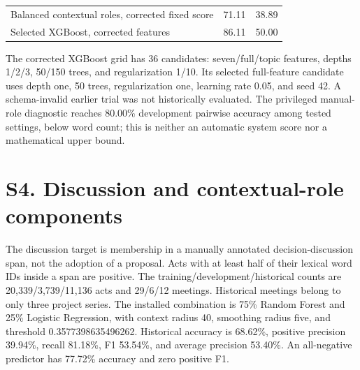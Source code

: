 \documentclass[journal,onecolumn]{IEEEtran}
\begin{document}
\begin{table}[htbp]
\begin{tabular}{p{}p{}p{}}
{\raggedright Balanced contextual roles, corrected fixed score\par} & {\raggedright 71.11\par} & {\raggedright 38.89\par} \\
{\raggedright Selected XGBoost, corrected features\par} & {\raggedright 86.11\par} & {\raggedright 50.00\par} \\
\bottomrule
\end{tabular}
\end{table}
The corrected XGBoost grid has 36 candidates: seven/full/topic features, depths 1/2/3, 50/150 trees, and regularization 1/10. Its selected full-feature candidate uses depth one, 50 trees, regularization one, learning rate 0.05, and seed 42. A schema-invalid earlier trial was not historically evaluated. The privileged manual-role diagnostic reaches 80.00\% development pairwise accuracy among tested settings, below word count; this is neither an automatic system score nor a mathematical upper bound.

\section*{S4. Discussion and contextual-role components}
The discussion target is membership in a manually annotated decision-discussion span, not the adoption of a proposal. Acts with at least half of their lexical word IDs inside a span are positive. The training/development/historical counts are 20,339/3,739/11,136 acts and 29/6/12 meetings. Historical meetings belong to only three project series. The installed combination is 75\% Random Forest and 25\% Logistic Regression, with context radius 40, smoothing radius five, and threshold 0.3577398635496262. Historical accuracy is 68.62\%, positive precision 39.94\%, recall 81.18\%, F1 53.54\%, and average precision 53.40\%. An all-negative predictor has 77.72\% accuracy and zero positive F1.
\end{document}
